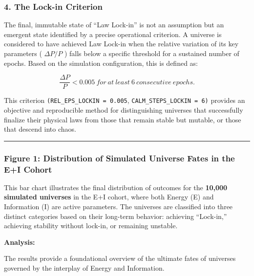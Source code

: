 \subsubsection{4. The Lock-in Criterion}\label{the-lock-in-criterion}

The final, immutable state of ``Law Lock-in'' is not an assumption but
an emergent state identified by a precise operational criterion. A
universe is considered to have achieved Law Lock-in when the relative
variation of its key parameters ( \(\Delta P/P\) ) falls below a
specific threshold for a sustained number of epochs. Based on the
simulation configuration, this is defined as:

\[
\frac{\Delta P}{P} < 0.005\  for\ at\ least\ 6\ consecutive\ epochs.
\]

This criterion \texttt{(REL\_EPS\_LOCKIN\ =\ 0.005},
\texttt{CALM\_STEPS\_LOCKIN\ =\ 6)} provides an objective and
reproducible method for distinguishing universes that successfully
finalize their physical laws from those that remain stable but mutable,
or those that descend into chaos.

\begin{center}\rule{0.5\linewidth}{0.5pt}\end{center}

\subsubsection{Figure 1: Distribution of Simulated Universe Fates in the
E+I
Cohort}\label{figure-1-distribution-of-simulated-universe-fates-in-the-ei-cohort}

This bar chart illustrates the final distribution of outcomes for the
\textbf{10,000 simulated universes} in the E+I cohort, where both Energy
(E) and Information (I) are active parameters. The universes are
classified into three distinct categories based on their long-term
behavior: achieving ``Lock-in,'' achieving stability without lock-in, or
remaining unstable.

\textbf{Analysis:}

The results provide a foundational overview of the ultimate fates of
universes governed by the interplay of Energy and Information.

